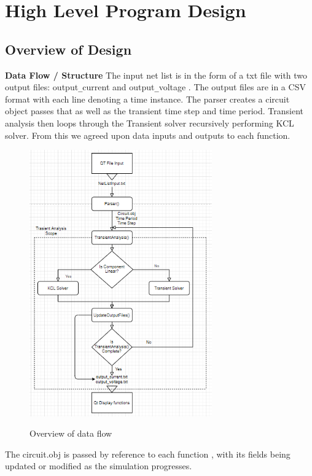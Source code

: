 \documentclass{article}
\begin{document}
\section{High Level Program Design }
\subsection{Overview of Design}
\textbf{Data Flow / Structure}
\newline
The input net list is in the form of a txt file with two output files: output\verb|_|current and output\verb|_|voltage . The output files are in a CSV format with each line denoting a time instance. The parser creates a circuit object passes that as well as the transient time step and time period. Transient analysis then loops through the Transient solver recursively performing KCL solver. From this we agreed upon data inputs and outputs to each function.

\begin{figure}[h]
    \caption{Overview of data flow}
    \centering
    \includegraphics[width=0.7\textwidth]{images/Overview.PNG}
    \label{fig:AlgoOverview}
\end{figure}

The circuit.obj is passed by reference to each function , with its fields being updated or modified as the simulation progresses. 
\end{document}
